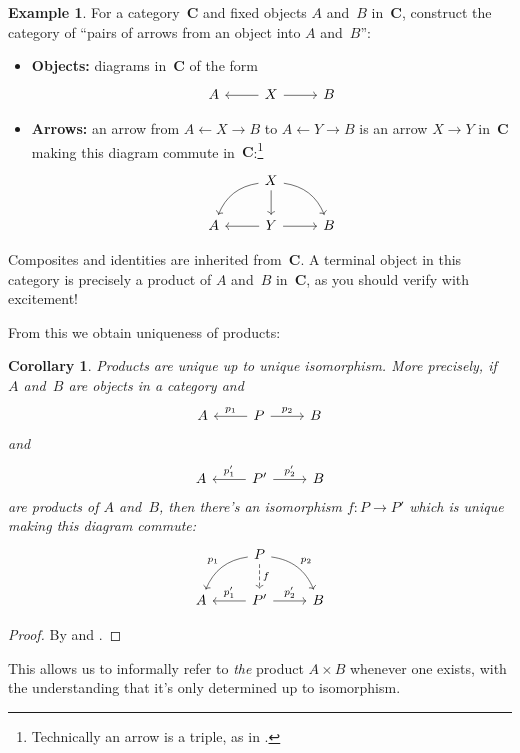 \documentclass[letterpaper,12pt]{article}
\newcommand{\from}{\leftarrow}
\newcommand{\cat}[1]{\mathbf{#1}}
\theoremstyle{definition}
\newtheorem{exmp}[equation]{Example}
\theoremstyle{plain}
\newtheorem{cor}[equation]{Corollary}
\numberwithin{equation}{section}
\begin{document}
\begin{exmp}
For a category~\(\cat{C}\) and fixed objects \(A\) and~\(B\) in~\(\cat{C}\), construct the category of ``pairs of arrows from an object into \(A\) and~\(B\)'':
\begin{itemize}
\item \textbf{Objects:} diagrams in~\(\cat{C}\) of the form
\begin{equation*}
\begin{tikzcd}
A & \ar[l] X \ar[r] & B
\end{tikzcd}
\end{equation*}
\item \textbf{Arrows:} an arrow from \(A\from X\to B\) to \(A\from Y\to B\) is an arrow \(X\to Y\) in~\(\cat{C}\) making this diagram commute in~\(\cat{C}\):\footnote{Technically an arrow is a triple, as in .}
\begin{equation*}
\begin{tikzcd}
 & X \ar[ld,bend right] \ar[d] \ar[rd,bend left] & \\
A & \ar[l] Y \ar[r] & B
\end{tikzcd}
\end{equation*}
\end{itemize}
Composites and identities are inherited from~\(\cat{C}\). A terminal object in this category is precisely a product of \(A\) and~\(B\) in~\(\cat{C}\), as you should verify with excitement!
\label{exmp:productterminal}
\end{exmp}

\noindent From this we obtain uniqueness of products:
\begin{cor}
Products are unique up to unique isomorphism. More precisely, if \(A\) and~\(B\) are objects in a category and
\begin{equation*}
\begin{tikzcd}
A & \ar[l,"p_1"'] P \ar[r, "p_2"] & B
\end{tikzcd}
\end{equation*}
and
\begin{equation*}
\begin{tikzcd}
A & \ar[l,"p_1'"'] P' \ar[r, "p_2'"] & B
\end{tikzcd}
\end{equation*}
are products of \(A\) and~\(B\), then there's an isomorphism \(f:P\to P'\) which is unique making this diagram commute:
\begin{equation*}
\begin{tikzcd}
 & P \ar[ld,bend right,"p_1"'] \ar[d,dashed,"f"] \ar[rd,bend left,"p_2"] & \\
A & \ar[l,"p_1'"'] P' \ar[r,"p_2'"] & B
\end{tikzcd}
\end{equation*}
\label{cor:productunique}
\end{cor}
\begin{proof}
By  and .
\end{proof}
\noindent This allows us to informally refer to \emph{the} product \(A\times B\) whenever one exists, with the understanding that it's only determined up to isomorphism.
\end{document}
